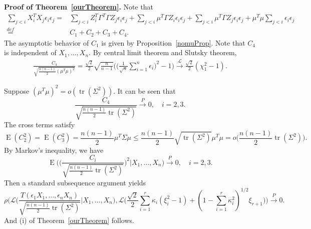 \documentclass[3p]{elsarticle}
\DeclareMathOperator{\mytr}{tr}
\DeclareMathOperator{\myE}{E}
\theoremstyle{plain}
\theoremstyle{definition}
\theoremstyle{remark}
\begin{document}
\textbf{Proof of Theorem~\ref{ourTheorem}. }
Note that
    \begin{equation*}
        \begin{aligned}
            \sum_{j<i} X_i^T X_j \epsilon_i\epsilon_j
            =&
            \sum_{j<i} Z_i^T \Gamma^T \Gamma Z_j \epsilon_i\epsilon_j
            +
            \sum_{j<i} \mu^T \Gamma Z_i \epsilon_i\epsilon_j
            +\sum_{j<i} \mu^T \Gamma Z_j \epsilon_i\epsilon_j+
            \mu^T \mu \sum_{j<i} \epsilon_i\epsilon_j\\
            \overset{def}{=}&C_1+C_2+C_3+C_4.
        \end{aligned}
    \end{equation*}
    The asymptotic behavior of $C_1$ is given by Proposition~\ref{nomuProp}.
    Note that $C_4$ is independent of $X_1,\ldots,X_n$.
    By central limit theorem and Slutsky theorem,
    \begin{equation*}
        \begin{aligned}
            \frac{C_4}
            {\sqrt{\frac{n(n-1)}{2}(\mu^T\mu)^2}}
            =\frac{\sqrt{2}}{2}\sqrt{\frac{n}{n-1}}\Big(\big(\frac{1}{\sqrt{n}}\sum_{i=1}^n \epsilon_i\big)^2-1\Big)\xrightarrow{\mathcal{L}}\frac{\sqrt{2}}{2}(\chi^2_1-1).
        \end{aligned}
    \end{equation*}

    Suppose $(\mu^T \mu)^2=o(\mytr(\Sigma^2))$. It can be seen that 
    $$
        \frac{C_4}{\sqrt{\frac{n(n-1)}{2}\mytr(\Sigma^2)}}
        \xrightarrow{P} 0,\quad i=2,3.
    $$
    The cross terms satisfy
    \begin{equation*}
    \myE(C_2^2)=\myE(C_3^2)=\frac{n(n-1)}{2}\mu^T \Sigma \mu
        \leq \frac{n(n-1)}{2}\sqrt{\mytr (\Sigma^2)}\mu^T\mu
        = o\Big(\frac{n(n-1)}{2}\mytr (\Sigma^2)\Big).
    \end{equation*}
    By Markov's inequality, we have
    \begin{equation*}
        \myE\Big(\Big(\frac{C_i}{\sqrt{\frac{n(n-1)}{2}\mytr(\Sigma^2)}}
        \Big)^2\Big|X_1,\ldots,X_n\Big)\xrightarrow{P} 0,\quad i=2,3.
    \end{equation*}
    Then a standard subsequence argument yields
    $$
            \rho\Big(\mathcal{L}\Big(\frac{T(\epsilon_1 X_1,\ldots, \epsilon_n X_n)}{\sqrt{\frac{n(n-1)}{2}\mytr(\Sigma^2)}}\Big| X_1,\ldots,X_n\Big)
            ,
            \mathcal{L}\big(\frac{\sqrt{2}}{2}\sum_{i=1}^r \kappa_i (\xi_i^2-1)+(1-\sum_{i=1}^r \kappa_i^2)^{1/2} \xi_{r+1}\big)
            \Big)\xrightarrow{P}0.
    $$
And (i) of Theorem~\ref{ourTheorem} follows.
\end{document}
